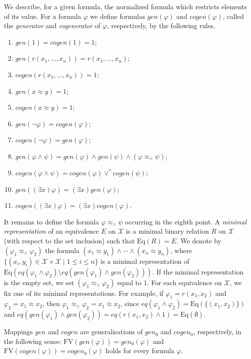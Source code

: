 \documentclass{lmcs}
\def\tu#1{( #1)}
\def\X{\mathcal X}
\def\eq{eq}
\def\Eq{{\textrm{Eq}}}
\def\FV{\textrm{FV}}
\def\gen{gen}
\def\cogen{cogen}
\def\genz{\gen_0}
\def\cogenz{\cogen_0}
\newcommand{\st}{%
	\ensuremath{\;|\;}
}
\begin{document}
We describe, for a given formula, the normalized formula which restricts elements of its value. For a formula $\varphi$ we define formulas $\gen(\varphi)$ and $\cogen(\varphi)$, called the \emph{generator} and \emph{cogenerator} of $\varphi$, respectively, by the following rules.
\begin{enumerate}
\item $\gen(1)=\cogen(1)=1$;
\item $\gen(r(x_1,\ldots,x_n))=r(x_1,\ldots,x_n)$;
\item $\cogen(r(x_1,\ldots,x_n))=1$;
\item $\gen(x\approx y)=1$;
\item $\cogen(x\approx y)=1$;
\item $\gen(\neg\varphi)=\cogen(\varphi)$;
\item $\cogen(\neg\varphi)=\gen(\varphi)$;
\item $\gen(\varphi\wedge\psi)=\gen(\varphi)\wedge\gen(\psi)\wedge(\varphi\approx_\wedge\psi)$;
\item $\cogen(\varphi\wedge\psi)=\cogen(\varphi)\vee^*\cogen(\psi)$;
\item $\gen((\exists x)\varphi)=(\exists x)\gen(\varphi)$;
\item $\cogen((\exists x)\varphi)=(\exists x)\cogen(\varphi)$.
\end{enumerate}
It remains to define the formula $\varphi\approx_\wedge\psi$ occurring in the eighth point. A \emph{minimal representation} of an equivalence $E$ on $\X$ is a minimal binary relation $R$ on $\X$ (with respect to the set inclusion) such that $\Eq(R)=E$. We denote by $(\varphi_1\approx_\wedge\varphi_2)$ the formula $(x_1\approx y_1)\wedge\cdots\wedge (x_n\approx y_n)$, where $\{\tu{x_i,y_i}\in\X\times\X\st 1\leq i \leq n\}$ is a minimal representation of $\Eq(\eq(\varphi_1\wedge\varphi_2)\setminus\eq(\gen(\varphi_1)\wedge\gen(\varphi_2)))$. If the minimal representation is the empty set, we set $(\varphi_1\approx_\wedge\varphi_2)$ equal to $1$. For each equivalence on $\X$, we fix one of its minimal representations. For example, if $\varphi_1=r(x_1,x_2)$ and $\varphi_2=x_1\approx x_2$, then $\varphi_1\approx_\wedge\varphi_2=x_1\approx x_2$, since $\eq(\varphi_1\wedge\varphi_2)=\Eq(\{\tu{x_1,x_2}\})$ and $\eq(\gen(\varphi_1)\wedge\gen(\varphi_2))=\eq(r(x_1,x_2)\wedge1)=\Eq(\emptyset)$.


Mappings $\gen$ and $\cogen$ are generalisations of $\genz$ and $\cogenz$, respectively, in the following sense:
$\FV(\gen(\varphi))=\genz(\varphi)$ and $\FV(\cogen(\varphi))=\cogenz(\varphi)$ holds for every formula $\varphi$.
\end{document}
